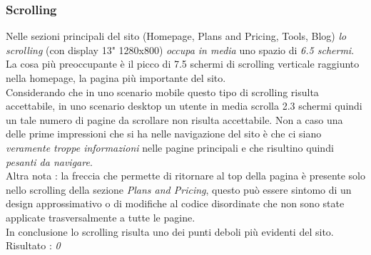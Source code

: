 \subsubsection{Scrolling}\label{scrolling}
Nelle sezioni principali del sito (Homepage, Plans and Pricing, Tools, Blog) 
\textit{lo scrolling} (con display 13" 1280x800) \textit{occupa in media} uno spazio di 
\textit{6.5 schermi}. La cosa più preoccupante è il picco di 7.5 schermi di 
scrolling verticale raggiunto nella homepage, la pagina più importante del sito. \\
Considerando che in uno scenario mobile questo tipo di scrolling
risulta accettabile, in uno scenario desktop un utente in media scrolla 2.3 schermi
quindi un tale numero di pagine da scrollare non risulta accettabile. 
Non a caso una delle prime impressioni che si ha nelle 
navigazione del sito è che ci siano \textit{veramente troppe informazioni} 
nelle pagine principali e che risultino quindi \textit{pesanti da navigare}. \\
Altra nota : la freccia che permette di ritornare al top della 
pagina è presente solo nello scrolling della sezione \textit{Plans and Pricing},
questo può essere sintomo di un design approssimativo o di modifiche al codice
disordinate che non sono state applicate trasversalmente a tutte le pagine. \\
In conclusione lo scrolling risulta uno dei punti deboli più evidenti
del sito. \\
Risultato : \textit{0}
